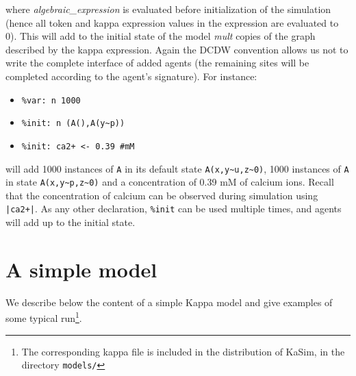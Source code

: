 \documentclass[11pt]{book}
\def\KaSim{\textsf{KaSim}}
\def\intstate{\textasciitilde}
\def\ttt#1{\texttt{#1}}
\def\ITE#1{\begin{itemize}#1\end{itemize}}
\begin{document}
where \textit{algebraic\_expression} is evaluated before initialization of the simulation (hence all token and kappa expression values in the expression are evaluated to 0). This will add to the initial state of the model \textit{mult} copies of the graph described by the kappa expression. Again the DCDW convention allows us not to write the complete interface of added agents (the remaining sites will be completed according to the agent's signature). For instance:
\ITE{
\item[] \ttt{\%var: {\textquotesingle}n\textquotesingle~1000}
\item[] \ttt{\%init: {\textquotesingle}n\textquotesingle~(A(),A(y\intstate p))}
\item[] \ttt{\%init: ca2+ <- 0.39 \#mM}
}
will add 1000 instances of \ttt{A} in its default state \ttt{A(x,y\intstate u,z\intstate 0)}, 1000 instances of \ttt{A} in state \ttt{A(x,y\intstate p,z\intstate 0)} and a concentration of 0.39 mM of calcium ions. Recall that the concentration of calcium can be observed during simulation using \ttt{|ca2+|}.
As any other declaration, \ttt{\%init} can be used multiple times, and agents will add up to the initial state.

\chapter{A simple model}\label{chap:abc}

We describe below the content of a simple Kappa model and give examples of some typical run\footnote{The corresponding kappa file is included in the distribution of \KaSim, in the directory \ttt{models/}}.
\end{document}
